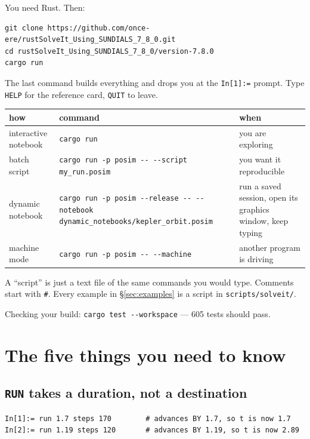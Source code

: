 \documentclass[11pt]{article}
\newcommand{\kw}[1]{\texttt{\uppercase{#1}}}
\newcommand{\code}[1]{\texttt{#1}}
\begin{document}
You need Rust. Then:

\begin{lstlisting}
git clone https://github.com/once-ere/rustSolveIt_Using_SUNDIALS_7_8_0.git
cd rustSolveIt_Using_SUNDIALS_7_8_0/version-7.8.0
cargo run
\end{lstlisting}

The last command builds everything and drops you at the \code{In[1]:=}
prompt. Type \kw{help} for the reference card, \kw{quit} to leave.

\begin{center}
\begin{tabular}{p{3.4cm}p{7.4cm}p{3.6cm}}
\textbf{how} & \textbf{command} & \textbf{when}\\\hline
interactive notebook & \code{cargo run} & you are exploring\\
batch script & \code{cargo run -p posim -{}- -{}-script my\_run.posim} &
you want it reproducible\\
dynamic notebook & \code{cargo run -p posim -{}-release -{}- -{}-notebook
dynamic\_notebooks/kepler\_orbit.posim} & run a saved session, open its
graphics window, keep typing\\
machine mode & \code{cargo run -p posim -{}- -{}-machine} & another
program is driving\\
\end{tabular}
\end{center}

A ``script'' is just a text file of the same commands you would type.
Comments start with \code{\#}. Every example in \S\ref{sec:examples} is a
script in \code{scripts/solveit/}.

Checking your build: \code{cargo test -{}-workspace} --- 605 tests should
pass.

\section{The five things you need to know}

\subsection{\kw{run} takes a duration, not a destination}

\begin{lstlisting}
In[1]:= run 1.7 steps 170        # advances BY 1.7, so t is now 1.7
In[2]:= run 1.19 steps 120       # advances BY 1.19, so t is now 2.89
\end{lstlisting}
\end{document}
